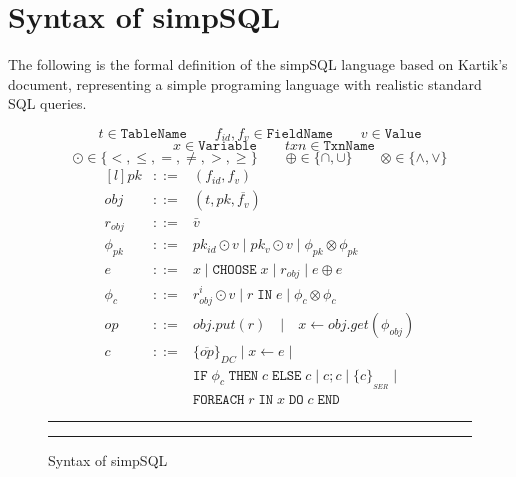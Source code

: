 \documentclass[12pt,letter]{article}
\begin{document}


\section{Syntax of simpSQL}
The following is the formal definition of the simpSQL language based on Kartik's document,
representing a simple programing language with realistic standard SQL queries.

\begin{figure}[h]
	$$
	t \in \texttt{TableName} \qquad 
	f_{id},f_v \in \texttt{FieldName} \qquad 
	v \in \texttt{Value} $$
	\vspace{-7mm} %
	$$\qquad
	x \in \texttt{Variable} \qquad
	txn \in \texttt{TxnName}
	$$
	\vspace{-6mm} %
	$$ \odot \in \{<,\leq,=,\neq,>,\geq\} \qquad 
	\oplus \in \{\cap,\cup\} \qquad 
	\otimes \in \{\wedge, \vee\}
	$$ 
	$$
	\begin{matrix*}[l]
		pk & ::= & (f_{id},f_v)\\
		obj &  ::= & (t,pk,\overline{f_v}) \\
		r_{obj} &  ::= & \bar{v} \\
		\phi_{pk}  & ::= & pk_{id} \odot v \;|\; pk_{v} \odot v
		\;|\; \phi_{pk} \otimes \phi_{pk} \\
		e  & ::= & x \;|\; \texttt{CHOOSE} \; x\;|\; r_{obj} \;|\; e \oplus e\\
		\phi_{c}  & ::= & r^i_{obj}\odot v \;|\;  r\;\texttt{IN} \; e \;|\; \phi_{c} \otimes \phi_{c} \\
		op   & ::= & obj.put(r) \quad
		|\quad x\leftarrow obj.get(\phi_{obj})  \\
		c   & ::=  & \{\overline{op}\}_{DC}
		\;|\; x\leftarrow e \;|\;
		\\  & & \texttt{IF}\; \phi_c \;\texttt{THEN} \;c \;\texttt{ELSE}\; c \;|\;  c;c \;|\;
		\{c\}_{_{SER}} \;|\;
		\\  & & \texttt{FOREACH}\; r \;\texttt{IN} \; x \; \texttt{DO}\; c \;\texttt{END}
		
	\end{matrix*}
	$$
	\hrule \hrule 
\caption{Syntax of simpSQL}
\label{fig:standard}
\end{figure}
\end{document}
